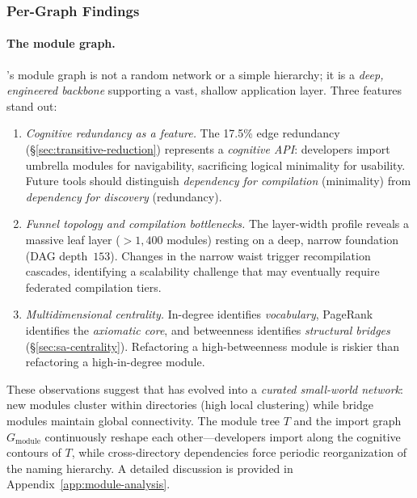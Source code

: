 \subsubsection{Per-Graph Findings}

\paragraph{The module graph.}
\label{sec:module_conclusion}
's module graph is not a random network or a simple hierarchy; it is a \textit{deep, engineered backbone} supporting a vast, shallow application layer. Three features stand out:

\begin{enumerate}
    \item \textit{Cognitive redundancy as a feature.} The 17.5\% edge redundancy (\S\ref{sec:transitive-reduction}) represents a \textit{cognitive API}: developers import umbrella modules for navigability, sacrificing logical minimality for usability. Future tools should distinguish \textit{dependency for compilation} (minimality) from \textit{dependency for discovery} (redundancy).

    \item \textit{Funnel topology and compilation bottlenecks.} The layer-width profile reveals a massive leaf layer ($>1{,}400$ modules) resting on a deep, narrow foundation (DAG depth~$153$). Changes in the narrow waist trigger recompilation cascades, identifying a scalability challenge that may eventually require federated compilation tiers.

    \item \textit{Multidimensional centrality.} In-degree identifies \textit{vocabulary}, PageRank identifies the \textit{axiomatic core}, and betweenness identifies \textit{structural bridges} (\S\ref{sec:sa-centrality}). Refactoring a high-betweenness module is riskier than refactoring a high-in-degree module.
\end{enumerate}

\noindent
These observations suggest that  has evolved into a \textit{curated small-world network}: new modules cluster within directories (high local clustering) while bridge modules maintain global connectivity. The module tree $T$ and the import graph $G_{\mathrm{module}}$ continuously reshape each other---developers import along the cognitive contours of $T$, while cross-directory dependencies force periodic reorganization of the naming hierarchy. A detailed discussion is provided in Appendix~\ref{app:module-analysis}.

